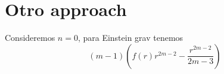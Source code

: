 \section{Otro approach}
Consideremos $n=0$, para Einstein grav tenemos
\begin{equation}
  \left(m -1\right) \left(f \! \left(r \right) r^{2 m -2}-\frac{r^{2 m -2}}{2 m -3}\right)
\end{equation}
